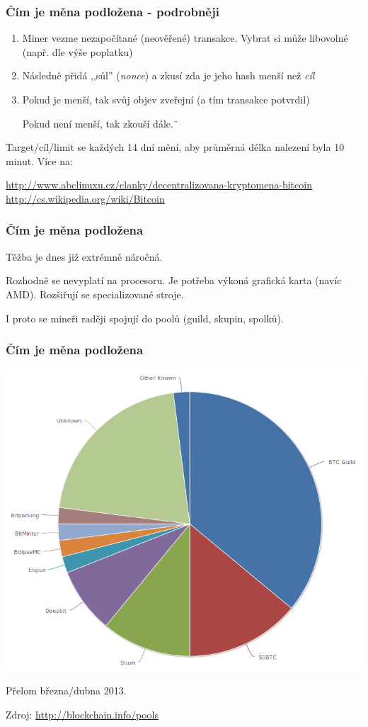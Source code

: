 \documentclass[xetex]{beamer}
\begin{document}
\begin{frame}
	\frametitle{Čím je měna podložena - podrobněji}
	\begin{enumerate}
		\item Miner vezme nezapočítané (neověřené) transakce. Vybrat si může libovolné (např. dle výše poplatku)
		\item Následně přidá ,,sůl'' (\textit{nonce}) a zkusí zda je jeho hash menší než \textit{cíl}
		\item Pokud je menší, tak svůj objev zveřejní (a tím transakce potvrdil)
			
			Pokud není menší, tak zkouší dále.¨
	\end{enumerate}

	Target/cíl/limit se každých 14 dní mění, aby průměrná délka nalezení byla 10 minut. Více na:\\
	\begin{scriptsize}
	\url{http://www.abclinuxu.cz/clanky/decentralizovana-kryptomena-bitcoin}\\
	\url{http://cs.wikipedia.org/wiki/Bitcoin}
	\end{scriptsize}
\end{frame}

\begin{frame}
	\frametitle{Čím je měna podložena}
	Těžba je dnes již extrémně náročná. 

	\bigskip

	Rozhodně se nevyplatí na procesoru. Je potřeba výkoná grafická karta (navíc AMD). Rozšiřují se specializované stroje.

	\bigskip 

	I proto se mineři raději spojují do poolů (guild, skupin, spolků).
\end{frame}

\begin{frame}
	\frametitle{Čím je měna podložena}
	
	\includegraphics[scale=0.25]{images/bitcoin-pools.png}

	Přelom března/dubna 2013.

	Zdroj: \url{http://blockchain.info/pools}
\end{frame}
\end{document}
